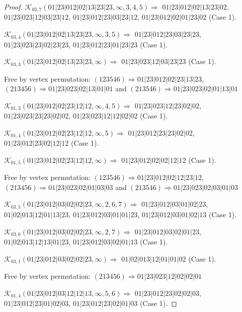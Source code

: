 \documentclass[12pt]{article}
\theoremstyle{plain}
\theoremstyle{definition}
\theoremstyle{remark}
\newcommand{\fancy}[1]{\mathcal{#1}}
\def\K{\fancy{K}}
\begin{document}
\begin{proof}
	$\K_{03,7}(01|23|012|02|13|23|23,\infty,3, 4, 5)\Rightarrow $ $01|23|012|02|13|23|02$, $01|23|023|12|03|23|12$, $01|23|012|23|03|23|12$, $01|23|012|02|01|23|02$ (Case 1).
	
	$\K_{03,4}(01|23|012|02|13|23|23,\infty,3, 5)\Rightarrow $ $01|23|012|23|03|23|23$, $01|23|023|23|02|23|23$, $01|23|012|23|01|23|23$ (Case 1).
	
	$\K_{03,3}(01|23|012|02|13|23|23,\infty)\Rightarrow $ $01|23|023|12|03|23|23$ (Case 1).
	
	
	
	Free by vertex permutation: $(1 2 3 5 4 6)\Rightarrow 01|23|012|02|23|13|23$, $(2 1 3 4 5 6)\Rightarrow 01|23|023|02|13|01|01$ and $(2 1 3 5 4 6)\Rightarrow 01|23|023|02|01|13|01$
	
	
	
	\bigskip
	
	$\K_{01,3}(01|23|012|02|23|12|12,\infty,4, 5)\Rightarrow $ $01|23|023|12|23|02|02$, $01|23|023|23|23|02|02$, $01|23|023|12|12|02|02$ (Case 1).
	
	$\K_{01,4}(01|23|012|02|23|12|12,\infty,5)\Rightarrow $ $01|23|012|23|23|02|02$, $01|23|012|23|02|12|12$ (Case 1).
	
	$\K_{01,5}(01|23|012|02|23|12|12,\infty)\Rightarrow $ $01|23|012|02|02|12|12$ (Case 1).
	
	
	
	Free by vertex permutation: $(1 2 3 5 4 6)\Rightarrow 01|23|012|02|12|23|12$, $(2 1 3 4 5 6)\Rightarrow 01|23|023|02|01|03|03$ and $(2 1 3 5 4 6)\Rightarrow 01|23|023|02|03|01|03$
	
	
	
	\bigskip
	
	$\K_{03,5}(01|23|012|03|02|02|23,\infty,2, 6, 7)\Rightarrow $ $01|23|012|03|01|02|23$, $01|02|013|12|01|13|23$, $01|23|012|03|01|01|23$, $01|23|012|03|01|02|13$ (Case 1).
	
	$\K_{03,6}(01|23|012|03|02|02|23,\infty,2, 7)\Rightarrow $ $01|23|012|03|02|01|23$, $01|02|013|12|13|01|23$, $01|23|012|03|02|01|13$ (Case 1).
	
	$\K_{03,1}(01|23|012|03|02|02|23,\infty)\Rightarrow $ $01|02|013|12|01|01|02$ (Case 1).
	
	
	
	Free by vertex permutation: $(2 1 3 4 5 6)\Rightarrow 01|23|023|12|02|02|01$
	
	
	
	\bigskip
	
	$\K_{01,4}(01|23|012|03|12|12|13,\infty,5, 6)\Rightarrow $ $01|23|012|23|02|02|03$, $01|23|012|23|01|02|03$, $01|23|012|23|02|01|03$ (Case 1).
	

\end{proof}
\end{document}
